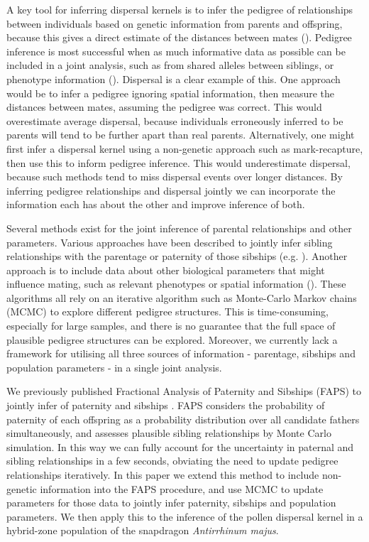 \documentclass[10pt, a4paper, twocolumn]{article} %
\begin{document}
A key tool for inferring dispersal kernels is to infer the pedigree of relationships between individuals based on genetic information from parents and offspring, because this gives a direct estimate of the distances between mates (\cite{adams1992using, cain2000long, austerlitz2004using,pemberton2008wild}).
Pedigree inference is most successful when as much informative data as possible can be included in a joint analysis, such as from shared alleles between siblings, or phenotype information (\cite{neff2001bayesian, wang2007parentage}).
Dispersal is a clear example of this.
One approach would be to infer a pedigree ignoring spatial information, then measure the distances between mates, assuming the pedigree was correct.
This would overestimate average dispersal, because individuals erroneously inferred to be parents will tend to be further apart than real parents.
Alternatively, one might first infer a dispersal kernel using a non-genetic approach such as mark-recapture, then use this to inform pedigree inference.
This would underestimate dispersal, because such methods tend to miss dispersal events over longer distances.
By inferring pedigree relationships and dispersal jointly we can incorporate the information each has about the other and improve inference of both.

Several methods exist for the joint inference of parental relationships and other parameters.
Various approaches have been described to jointly infer sibling relationships with the parentage or paternity of those sibships (e.g. \cite{emery2001assignment, thomas2002sibship, jones2007estimating, wang2004sibship, anderson2016bayesian}).
Another approach is to include data about other biological parameters that might influence mating, such as relevant phenotypes or spatial information (\cite{neff2001bayesian, hadfield2006towards}).
These algorithms all rely on an iterative algorithm such as Monte-Carlo Markov chains (MCMC) to explore different pedigree structures.
This is time-consuming, especially for large samples, and there is no guarantee that the full space of plausible pedigree structures can be explored.
Moreover, we currently lack a framework for utilising all three sources of information - parentage, sibships and population parameters - in a single joint analysis.

We previously published Fractional Analysis of Paternity and Sibships (FAPS) to jointly infer of paternity and sibships \cite{ellis2018efficient}.
FAPS considers the probability of paternity of each offspring as a probability distribution over all candidate fathers simultaneously, and assesses plausible sibling relationships by Monte Carlo simulation.
In this way we can fully account for the uncertainty in paternal and sibling relationships in a few seconds, obviating the need to update pedigree relationships iteratively.
In this paper we extend this method to include non-genetic information into the FAPS procedure, and use MCMC to update parameters for those data to jointly infer paternity, sibships and population parameters.
We then apply this to the inference of the pollen dispersal kernel in a hybrid-zone population of the snapdragon \textit{Antirrhinum majus}.
\end{document}
